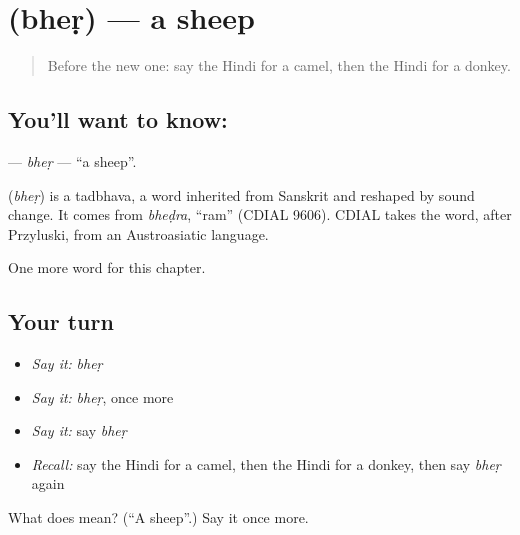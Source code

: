 \section[\texorpdfstring{\hi{भेड़} (bheṛ)}{भेड़ (bheṛ)}]{ (bheṛ) — a sheep}

\label{lesson:HI-C146-bher}



\begin{quote}
Before the new one: say the Hindi for a camel, then the Hindi for a donkey.
\end{quote}

\subsection*{You'll want to know: }
\textbf{} — \emph{bheṛ} — \textquotedblleft{}a sheep\textquotedblright{}.

\begin{cousinweb}
\textbf{} (\emph{bheṛ}) is a tadbhava, a word inherited from Sanskrit and reshaped by sound change. It comes from \emph{bheḍra}, \textquotedblleft{}ram\textquotedblright{} (CDIAL 9606). CDIAL takes the word, after Przyluski, from an Austroasiatic language.
\end{cousinweb}

\begin{grammarlens}[title={What you've built}]
One more word for this chapter.
\end{grammarlens}

\subsection*{Your turn}
\begin{itemize}
\raggedright
  \item \emph{Say it:} \emph{bheṛ}
  \item \emph{Say it:} \emph{bheṛ}, once more
  \item \emph{Say it:} say \emph{bheṛ}
  \item \emph{Recall:} say the Hindi for a camel, then the Hindi for a donkey, then say \emph{bheṛ} again
\end{itemize}

\begin{tcolorbox}[breakable,colback=teal!4,colframe=teal!35!black,title={Before you move on}]
What does  mean? (\textquotedblleft{}A sheep\textquotedblright{}.) Say it once more.
\end{tcolorbox}
